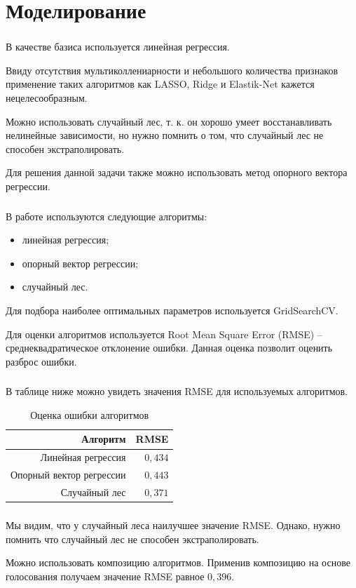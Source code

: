 \documentclass[c]{beamer}  %
\begin{document}
	\section{Моделирование}
	\begin{frame}
		\frametitle{\insertsection}
		\justifying

		В качестве базиса используется линейная регрессия.

		Ввиду отсутствия мультиколлениарности и небольшого количества признаков применение таких
		алгоритмов как LASSO, Ridge и Elastik-Net кажется нецелесообразным.

		Можно использовать случайный лес, т. к. он хорошо умеет восстанавливать нелинейные зависимости,
		но нужно помнить о том, что случайный лес не способен экстраполировать.

		Для решения данной задачи также можно использовать метод опорного вектора регрессии.
	\end{frame}

	\begin{frame}
		\frametitle{\insertsection}
		\justifying
		В работе используются следующие алгоритмы:
		\begin{itemize}
			\item линейная регрессия;
			\item опорный вектор регрессии;
			\item случайный лес.
		\end{itemize}

		Для подбора наиболее оптимальных параметров используется GridSearchCV.

		Для оценки алгоритмов используется Root Mean Square Error (RMSE) -- среднеквадратическое
		отклонение ошибки. Данная оценка позволит оценить разброс ошибки.
	\end{frame}

	\begin{frame}
		\frametitle{\insertsection}
		\justifying
		В таблице ниже можно увидеть значения RMSE для используемых алгоритмов.

		\begin{table}[H]
			\caption{Оценка ошибки алгоритмов}
			\begin{tabular}{|r|r|}
				\hline
				Алгоритм                 & RMSE    \\ \hline
				Линейная регрессия       & $0,434$ \\ \hline
				Опорный вектор регрессии & $0,443$ \\ \hline
				Случайный лес            & $0,371$ \\ \hline
			\end{tabular}
		\end{table}
	\end{frame}

	\begin{frame}
		\frametitle{\insertsection}
		\justifying
		
		Мы видим, что у случайный леса наилучшее значение RMSE. Однако, нужно помнить что случайный лес
		не способен экстраполировать.
		
		Можно использовать композицию алгоритмов. Применив композицию на основе голосования получаем
		значение RMSE равное $0,396$.
	\end{frame}
\end{document}
